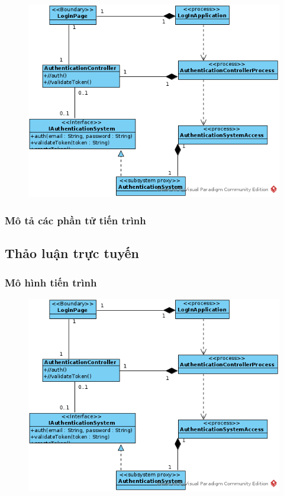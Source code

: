 \documentclass[./../main_file.tex]{subfiles}
\begin{document}
\begin{figure}[H]
	\centering
	\includegraphics[width=\linewidth]{./images/pv_login.png}
\end{figure}

\subsubsection{Mô tả các phần tử tiến trình}

\subsection{Thảo luận trực tuyến}

\subsubsection{Mô hình tiến trình}

\begin{figure}[H]
	\centering
	\includegraphics[width=\linewidth]{./images/pv_login.png}
\end{figure}
\end{document}
